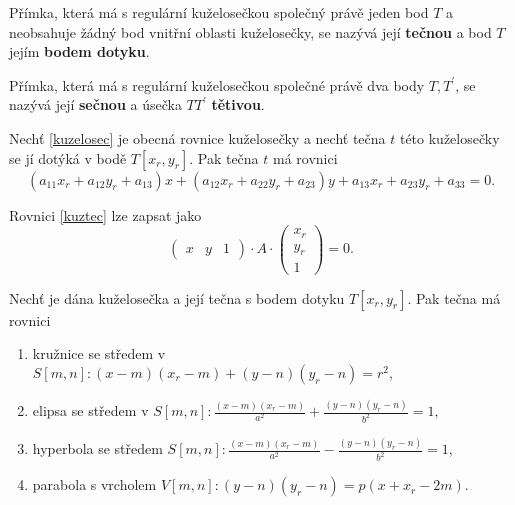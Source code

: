 \begin{definition}
    Přímka, která má s regulární kuželosečkou společný právě jeden bod $T$ a neobsahuje
    žádný bod vnitřní oblasti kuželosečky, se nazývá její \textbf{tečnou} a bod
    $T$ jejím \textbf{bodem dotyku}.
\end{definition}

\begin{definition}
Přímka, která má s regulární kuželosečkou společné právě dva body $T,T^\prime$, se
nazývá její \textbf{sečnou} a úsečka $TT^\prime$ \textbf{tětivou}.
\end{definition}

\begin{veta}
    Nechť \ref{kuzelosec} je obecná rovnice kuželosečky a nechť tečna $t$ této
    kuželosečky se jí dotýká v bodě $T[x_r, y_r].$ Pak tečna $t$ má rovnici
    \begin{equation}\label{kuztec}
        (a_{11}x_r+a_{12}y_r+a_{13})x+(a_{12}x_r+a_{22}y_r+a_{23})y+a_{13}x_r +
        a_{23}y_r+a_{33}=0.
    \end{equation}
\end{veta}

\begin{pozn}
    Rovnici \ref{kuztec} lze zapsat jako
    $$
    \begin{pmatrix}
        x & y & 1
    \end{pmatrix}\cdot A \cdot \begin{pmatrix}
        x_r \\
        y_r \\
        1
    \end{pmatrix}=0.
    $$
\end{pozn}

\begin{veta}
    Nechť je dána kuželosečka a její tečna s bodem dotyku $T[x_r,y_r].$ Pak tečna
    má rovnici
    \begin{enumerate}[$i.$]
    \item kružnice se středem v $S[m,n]:(x-m)(x_r-m)+(y-n)(y_r-n)=r^2,$
   	\item elipsa se středem v $S[m,n]:\frac{(x-m)(x_r-m)}{a^2}+\frac{(y-n)(y_r-n)}{b^2}=1$,
   	\item hyperbola se středem $S[m,n]:\frac{(x-m)(x_r-m)}{a^2}-\frac{(y-n)(y_r-n)}{b^2}=1$,
   	\item parabola s vrcholem $V[m,n]:(y-n)(y_r-n)=p(x+x_r-2m).$
    \end{enumerate}
\end{veta}

